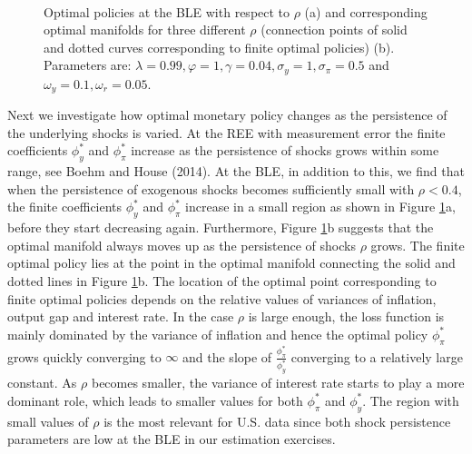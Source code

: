   \begin{figure}
    \begin{center}
        \mbox{\quad
        }
   \end{center}
   \caption{\label{optrho}  Optimal policies at the BLE with respect to $\rho$ (a) and corresponding optimal manifolds for three different $\rho$ (connection points of solid and dotted curves corresponding to finite optimal policies) (b). Parameters are: $\lambda=0.99, \varphi=1, \gamma=0.04,\sigma_y=1,\sigma_{\pi}=0.5$ and $\omega_y=0.1,\omega_r=0.05$.}
    \end{figure}


Next we investigate how optimal monetary policy changes as the persistence of the underlying shocks is varied. At the REE with measurement error the finite coefficients $\phi_y^*$ and $\phi_\pi^*$ increase as the persistence of shocks grows within some range, see Boehm and House (2014). At the BLE, in addition to this, we find that when the persistence of exogenous shocks becomes sufficiently small with $\rho<0.4$, the finite coefficients $\phi_y^*$ and $\phi_\pi^*$ increase in a small region as shown in Figure \ref{optrho}a, before they start decreasing again. Furthermore, Figure \ref{optrho}b suggests that the optimal manifold always moves up as the persistence of shocks $\rho$ grows. The finite optimal policy lies at the point in the optimal manifold connecting the solid and dotted lines in Figure \ref{optrho}b. The location of the optimal point corresponding to finite optimal policies depends on the relative values of variances of inflation, output gap and interest rate. In the case $\rho$ is large enough, the loss function is mainly dominated by the variance of inflation and hence the optimal policy $\phi_{\pi}^*$ grows quickly converging to $\infty$ and the slope of $\frac{\phi_\pi^*}{\phi_y^*}$ converging to a relatively large constant. As $\rho$ becomes smaller, the variance of interest rate starts to play a more dominant role, which leads to smaller values for both ${\phi_\pi^*} $ and ${\phi_y^*}$. The region with small values of $\rho$ is the most relevant for U.S. data since both shock persistence parameters are low at the BLE in our estimation exercises.

